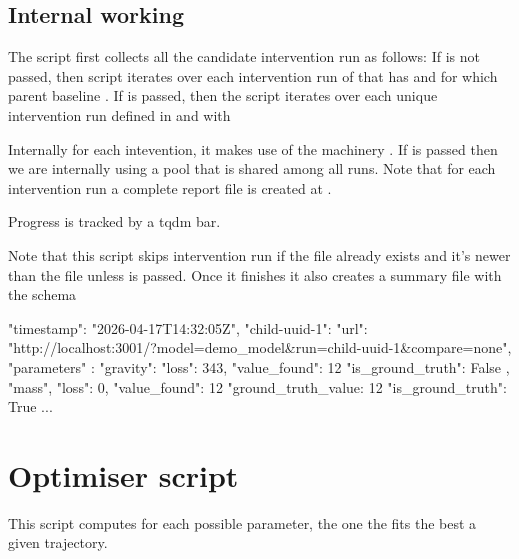 \documentclass[11pt]{article}
\begin{document}
\subsection{Internal working}
The script first collects all the candidate intervention run as follows:
If  is not passed, then script iterates over each intervention run of  that has  and for which parent baseline .
If  is passed, then the script iterates over each unique intervention run defined in  and    with 



Internally for each intevention, it makes use of the machinery . 
If  is passed then we are internally using a pool that is shared among all runs.  
Note that for each intervention run a complete report file is created at .

Progress is tracked by a tqdm bar.

Note that this script skips intervention run if the file already exists and it's newer than the  file  unless  is passed.
Once it finishes it also creates a summary file  with the schema
\begin{DocCode}
{
  "timestamp": "2026-04-17T14:32:05Z",
  "child-uuid-1": {
    "url": "http://localhost:3001/?model=demo_model&run=child-uuid-1&compare=none",
    "parameters" :
    "gravity":
    {
      "loss": 343,
      "value_found": 12
      "is_ground_truth": False
    },
    "mass",
    {
      "loss": 0,
      "value_found": 12
      "ground_truth_value: 12
      "is_ground_truth": True
    }
    ...
  }
}

\end{DocCode}


\section{Optimiser script}
This script computes for each possible parameter, the one the fits the best a given trajectory.
\end{document}
